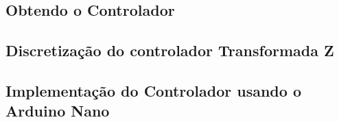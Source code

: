 \subsection{Obtendo o Controlador}




\subsection{Discretização do controlador Transformada Z}

\subsection{Implementação do Controlador usando o Arduino Nano}
